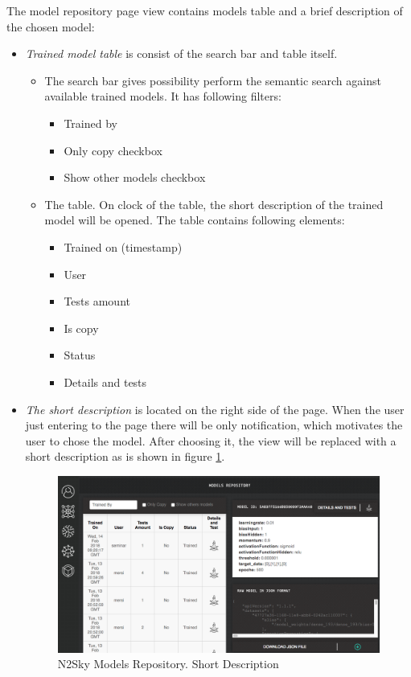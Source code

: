 The model repository page view contains models table and a brief description of  the chosen model:
\begin{itemize}
\item \emph{Trained model table} is consist of the search bar and table itself.
\begin{itemize}
\item The search bar gives possibility perform the semantic search against available trained models. It has following filters:
\begin{itemize}
\item Trained by
\item Only copy checkbox
\item Show other models checkbox
\end{itemize}
\item The table. On clock of the table, the short description of the trained model will be opened. The table contains following elements:
\begin{itemize}
\item Trained on (timestamp)
\item User
\item Tests amount
\item Is copy
\item Status
\item Details and tests
\end{itemize}
\end{itemize}

\item \emph{The short description} is located on the right side of the page. When the user just entering to the page there will be only notification, which motivates the user to chose the model. After choosing it, the view will be replaced with a short description as is shown in figure \ref{fig:short_desc}.

\begin{figure}[H]
\begin{center}
  \includegraphics[width=\linewidth]{components/5/img/short_desc.png}
  \caption{N2Sky Models Repository. Short Description}
  \label{fig:short_desc}
\end{center}
\end{figure} 


\end{itemize}
